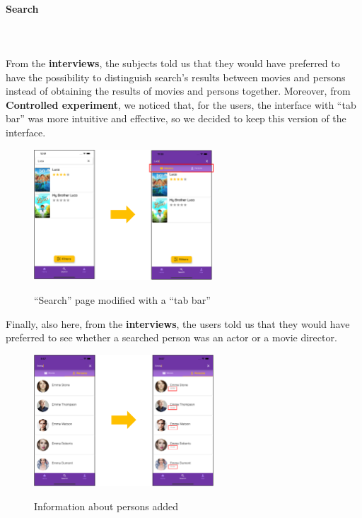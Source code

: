 \documentclass[12pt, a4paper]{article}
\numberwithin{figure}{section}
\begin{document}
\paragraph{Search}\mbox{}\\\\
From the \textbf{interviews}, the subjects told us that they would have preferred to have the possibility
to distinguish search's results between movies and persons instead of obtaining the results of movies and
persons together. Moreover, from \textbf{Controlled experiment}, we noticed that, for the users,
the interface with “tab bar” was more intuitive and effective, so we decided to keep this version
of the interface.
\begin{center}
	\begin{figure}[H]
		\centering
		\includegraphics[width=0.6\textwidth]{images/prototype2/search.png}\\
		\caption{“Search” page modified with a “tab bar”}
	\end{figure}
\end{center}
\vspace*{-0.5cm}
\noindent
Finally, also here, from the \textbf{interviews}, the users told us that they would have preferred
to see whether a searched person was an actor or a movie director.
\begin{center}
	\begin{figure}[H]
		\centering
		\includegraphics[width=0.6\textwidth]{images/prototype2/searchPerson.png}\\
		\caption{Information about persons added}
	\end{figure}
\end{center}
\end{document}
